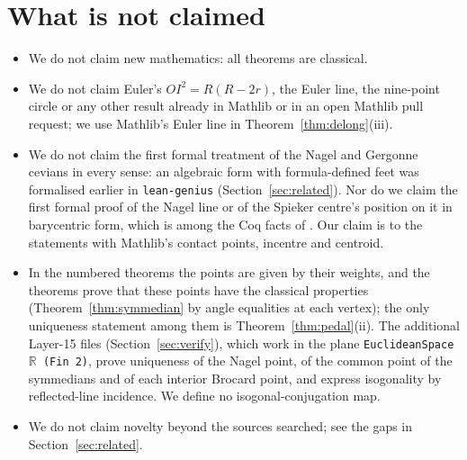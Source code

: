 \documentclass[11pt]{article}
\theoremstyle{definition}
\theoremstyle{remark}
\newcommand{\lean}[1]{\texttt{#1}}
\begin{document}
\section{What is not claimed}\label{sec:notclaimed}
\begin{itemize}
\item We do not claim new mathematics: all theorems are classical.
\item We do not claim Euler's $OI^2=R(R-2r)$, the Euler line, the nine-point circle or any other
result already in Mathlib or in an open Mathlib pull request; we use Mathlib's Euler line in
Theorem~\ref{thm:delong}(iii).
\item We do not claim the first formal treatment of the Nagel and Gergonne cevians in every sense: an
algebraic form with formula-defined feet was formalised earlier in \lean{lean-genius}
(Section~\ref{sec:related}). Nor do we claim the first formal proof of the Nagel line or of the
Spieker centre's position on it in barycentric form, which is among the Coq facts of
\cite{certifiedetc}. Our claim is to the statements with Mathlib's contact points, incentre and
centroid.
\item In the numbered theorems the points are given by their weights, and the theorems prove that
these points have the classical properties (Theorem~\ref{thm:symmedian} by angle equalities at each
vertex); the only uniqueness statement among them is Theorem~\ref{thm:pedal}(ii). The additional
Layer-15 files (Section~\ref{sec:verify}), which work in the plane \lean{EuclideanSpace \(\mathbb{R}\) (Fin 2)},
prove uniqueness of the Nagel point, of the common point of the symmedians and of each interior
Brocard point, and express isogonality by reflected-line incidence. We define no isogonal-conjugation
map.
\item We do not claim novelty beyond the sources searched; see the gaps in Section~\ref{sec:related}.
\end{itemize}
\end{document}
